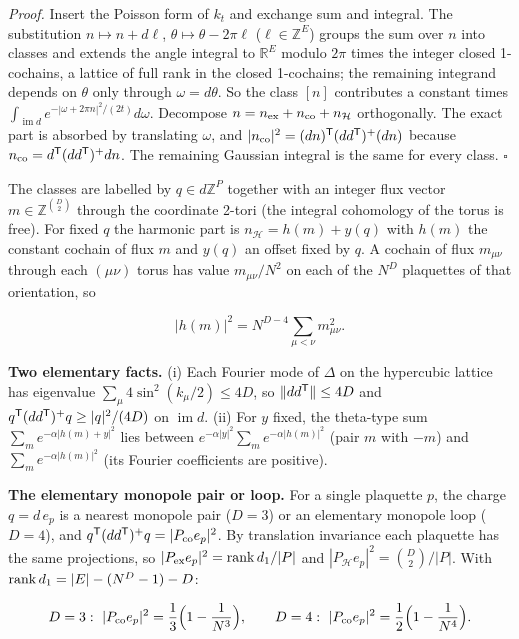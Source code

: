 \documentclass[11pt,a4paper]{article}
\begin{document}
\emph{Proof.} Insert the Poisson form of \(k_t\) and exchange sum and
integral. The substitution \(n\mapsto n+d\ell\),
\(\theta\mapsto\theta-2\pi\ell\) (\(\ell\in\mathbb Z^E\)) groups the sum
over \(n\) into classes and extends the angle integral to
\(\mathbb R^E\) modulo \(2\pi\) times the integer closed 1-cochains, a
lattice of full rank in the closed 1-cochains; the remaining integrand
depends on \(\theta\) only through \(\omega=d\theta\). So the class
\([n]\) contributes a constant times
\(\int_{\operatorname{im}d}e^{-|\omega+2\pi n|^2/(2t)}d\omega\).
Decompose \(n=n_{\rm ex}+n_{\rm co}+n_{\mathcal H}\) orthogonally. The
exact part is absorbed by translating \(\omega\), and
\(|n_{\rm co}|^2=(dn)^{\sf T}(dd^{\sf T})^+(dn)\) because
\(n_{\rm co}=d^{\sf T}(dd^{\sf T})^+dn\). The remaining Gaussian
integral is the same for every class. \(\square\)

The classes are labelled by \(q\in d\mathbb Z^P\) together with an
integer flux vector \(m\in\mathbb Z^{\binom D2}\) through the coordinate
2-tori (the integral cohomology of the torus is free). For fixed \(q\)
the harmonic part is \(n_{\mathcal H}=h(m)+y(q)\) with \(h(m)\) the
constant cochain of flux \(m\) and \(y(q)\) an offset fixed by \(q\). A
cochain of flux \(m_{\mu\nu}\) through each \((\mu\nu)\) torus has value
\(m_{\mu\nu}/N^2\) on each of the \(N^D\) plaquettes of that
orientation, so

\[|h(m)|^2=N^{D-4}\sum_{\mu<\nu}m_{\mu\nu}^2 .\]

\textbf{Two elementary facts.} (i) Each Fourier mode of \(\Delta\) on
the hypercubic lattice has eigenvalue \(\sum_\mu4\sin^2(k_\mu/2)\le4D\),
so \(\|dd^{\sf T}\|\le4D\) and \(q^{\sf T}(dd^{\sf T})^+q\ge|q|^2/(4D)\)
on \(\operatorname{im}d\). (ii) For \(y\) fixed, the theta-type sum
\(\sum_me^{-\alpha|h(m)+y|^2}\) lies between
\(e^{-\alpha|y|^2}\sum_me^{-\alpha|h(m)|^2}\) (pair \(m\) with \(-m\))
and \(\sum_me^{-\alpha|h(m)|^2}\) (its Fourier coefficients are
positive).

\textbf{The elementary monopole pair or loop.} For a single plaquette
\(p\), the charge \(q=d\,e_p\) is a nearest monopole pair (\(D=3\)) or
an elementary monopole loop (\(D=4\)), and
\(q^{\sf T}(dd^{\sf T})^+q=|P_{\rm co}e_p|^2\). By translation
invariance each plaquette has the same projections, so
\(|P_{\rm ex}e_p|^2={\rm rank}\,d_1/|P|\) and
\(|P_{\mathcal H}e_p|^2=\binom D2/|P|\). With
\({\rm rank}\,d_1=|E|-(N^D-1)-D\):

\[D=3:\ |P_{\rm co}e_p|^2=\frac13\Bigl(1-\frac1{N^3}\Bigr),\qquad
D=4:\ |P_{\rm co}e_p|^2=\frac12\Bigl(1-\frac1{N^4}\Bigr).\]
\end{document}
